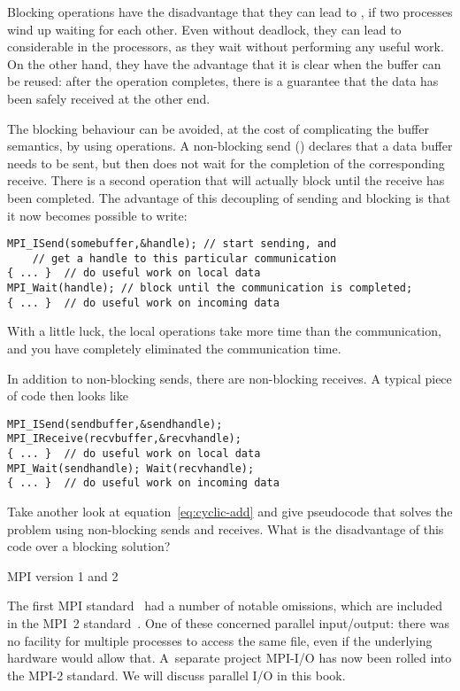 Blocking operations have the disadvantage that they can lead to
, if two processes wind up waiting for each other.
Even without deadlock, they can lead to considerable  in the processors, as they wait without performing any useful work.
On the other hand,  they have the advantage that it is clear when the
buffer can be reused: after the operation completes, there is a
guarantee that the data has been safely received at the other end.

The blocking behaviour can be avoided, at the cost of complicating the
buffer semantics, by using  operations. A
non-blocking send () declares that a data buffer needs to
be sent, but then does not wait for the completion of the
corresponding receive. There is a second operation  that
will actually block until the receive has been completed. The
advantage of this decoupling of sending and blocking is that it now
becomes possible to write:
\begin{verbatim}
MPI_ISend(somebuffer,&handle); // start sending, and
    // get a handle to this particular communication
{ ... }  // do useful work on local data
MPI_Wait(handle); // block until the communication is completed;
{ ... }  // do useful work on incoming data
\end{verbatim}
With a little luck, the local operations take more time than the
communication, and you have completely eliminated the communication
time.

In addition to non-blocking sends, there are non-blocking receives. A
typical piece of code then looks like
\begin{verbatim}
MPI_ISend(sendbuffer,&sendhandle);
MPI_IReceive(recvbuffer,&recvhandle);
{ ... }  // do useful work on local data
MPI_Wait(sendhandle); Wait(recvhandle);
{ ... }  // do useful work on incoming data
\end{verbatim}

\begin{exercise}
  Take another look at equation~\eqref{eq:cyclic-add} and give pseudocode that
  solves the problem using non-blocking sends and receives. What is
  the disadvantage of this code over a blocking solution?
\end{exercise}

 {MPI version 1 and 2}
\label{sec:mpi-1-2}

The first MPI standard~\cite{mpi-ref} had a number of notable
omissions, which are included in the MPI~2
standard~\cite{mpi-2-reference}. One of these concerned parallel
input/output: there was no facility for multiple processes to access
the same file, even if the underlying hardware would allow
that. A~separate project MPI-I/O has now been rolled into the MPI-2
standard. We will discuss parallel I/O in this book.

